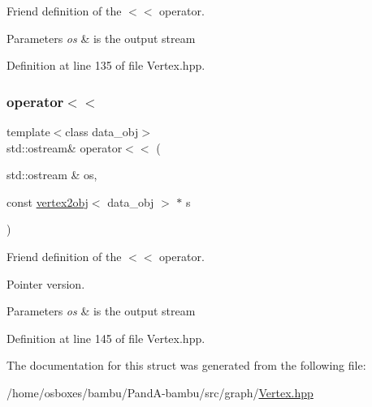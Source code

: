 Friend definition of the $<$$<$ operator. 


\begin{DoxyParams}{Parameters}
{\em os} & is the output stream \\
\hline
\end{DoxyParams}


Definition at line 135 of file Vertex.\+hpp.

\mbox{\label{structvertex2obj_a5de8fa8670478ea391d40aa1127d34ff}} 
\subsubsection{\texorpdfstring{operator$<$$<$}{operator<<}\hspace{0.1cm}{\footnotesize\ttfamily [2/2]}}
{\footnotesize\ttfamily template$<$class data\+\_\+obj$>$ \\
std\+::ostream\& operator$<$$<$ (\begin{DoxyParamCaption}\item[{std\+::ostream \&}]{os,  }\item[{const \hyperlink{structvertex2obj}{vertex2obj}$<$ data\+\_\+obj $>$ $\ast$}]{s }\end{DoxyParamCaption})\hspace{0.3cm}{\ttfamily [friend]}}



Friend definition of the $<$$<$ operator. 

Pointer version. 
\begin{DoxyParams}{Parameters}
{\em os} & is the output stream \\
\hline
\end{DoxyParams}


Definition at line 145 of file Vertex.\+hpp.



The documentation for this struct was generated from the following file\+:\begin{DoxyCompactItemize}
\item 
/home/osboxes/bambu/\+Pand\+A-\/bambu/src/graph/\hyperlink{Vertex_8hpp}{Vertex.\+hpp}\end{DoxyCompactItemize}
